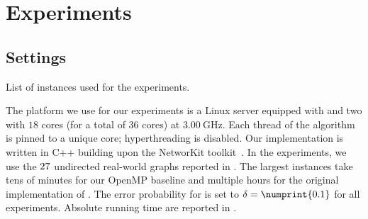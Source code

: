 \section{Experiments}
\label{sec:betw-apx:experiments}

\subsection{Settings}
%

\begin{table}[t]
\centering
\caption{List of instances used for the experiments.}
\label{tab:betw-apx:instances}
\scriptsize

\end{table}

The platform we use for our experiments is a Linux server equipped
with \egoram and two \egocpu with $18$ cores (for a total of $36$ cores)
at $\SI{3.00}{\GHz}$.
Each thread of the algorithm is pinned to a unique core; hyperthreading
is disabled.
%
Our implementation is written in C++ building upon the NetworKit
toolkit~\cite{DBLP:journals/netsci/StaudtSM16}.
In the experiments, we use the $27$ undirected real-world graphs
reported in .
The largest instances take tens of minutes for our OpenMP baseline and multiple
hours for the original implementation of \kadabra. The error probability
for \kadabra is set to $\delta = \numprint{0.1}$ for all experiments.
Absolute running time are reported in .

